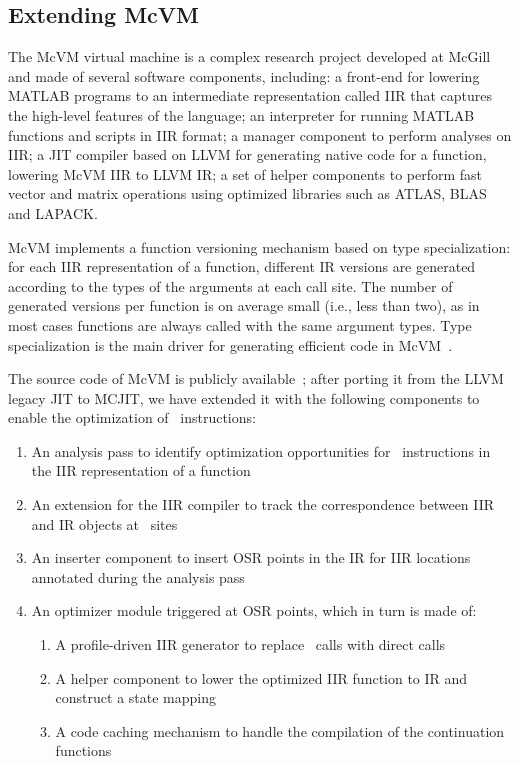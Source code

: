 \subsection{Extending McVM}
The McVM virtual machine is a complex research project developed at McGill and made of several software components, including: a front-end for lowering MATLAB programs to an intermediate representation called IIR that captures the high-level features of the language; an interpreter for running MATLAB functions and scripts in IIR format; a manager component to perform analyses on IIR; a JIT compiler based on LLVM for generating native code for a function, lowering McVM IIR to LLVM IR; a set of helper components to perform fast vector and matrix operations using optimized libraries such as ATLAS, BLAS and LAPACK. %

McVM implements a function versioning mechanism based on type specialization: for each IIR representation of a function, different IR versions are generated according to the types of the arguments at each call site. The number of generated versions per function is on average small (i.e., less than two), as in most cases functions are always called with the same argument types. Type specialization is the main driver for generating efficient code in McVM~\cite{chevalier2010mcvm}.

The source code of McVM is publicly available~\cite{mcvm}; after porting it from the LLVM legacy JIT to MCJIT, we have extended it with the following components to enable the optimization of \feval\ instructions:
\begin{enumerate}
\item An analysis pass to identify optimization opportunities for \feval\ instructions in the IIR representation of a function
\item An extension for the IIR compiler to track the correspondence between IIR and IR objects at \feval\ sites
\item An inserter component to insert OSR points in the IR for IIR locations annotated during the analysis pass
\item An optimizer module triggered at OSR points, which in turn is made of:
\begin{enumerate}
\item A profile-driven IIR generator to replace \feval\ calls with direct calls
\item A helper component to lower the optimized IIR function to IR and construct a state mapping 
\item A code caching mechanism to handle the compilation of the continuation functions
\end{enumerate}
\end{enumerate}

